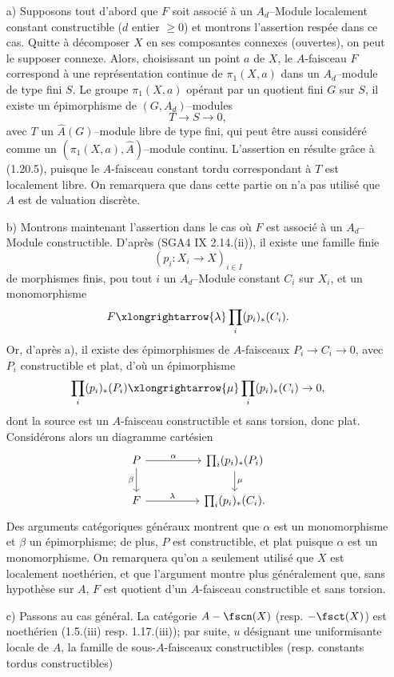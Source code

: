 \begin{itemize}
    \item[a)] Supposons tout d'abord que $F$ soit associé à un $A_d$--Module localement constant constructible ($d$ entier $\geq 0$) et montrons l'assertion respée dans ce cas. Quitte à décomposer $X$ en ses composantes connexes (ouvertes), on peut le supposer connexe. Alors, choisissant un point $a$ de $X$, le $A$-faisceau $F$ correspond à une représentation continue  de $\pi_1(X, a)$ dans un $A_d$--module de type fini $S$. Le groupe $\pi_1(X, a)$ opérant par un quotient fini $G$ sur $S$, il existe un épimorphisme de $(G, A_d)$--modules
    $$
    T \to S \to 0,
    $$
    avec $T$ un $\hat{A}(G)$--module libre de type fini, qui peut être aussi considéré comme un $(\pi_1(X, a), \hat{A})$--module continu. L'assertion en résulte grâce à (1.20.5), puisque le $A$-faisceau constant tordu correspondant à $T$ est localement libre. On remarquera que dans cette partie on n'a pas utilisé que $A$ est de valuation discrète. 
    \item[b)] Montrons maintenant l'assertion dans le cas où $F$ est associé à un $A_d$--Module constructible. D'après (SGA4 IX 2.14.(ii)), il existe une famille finie
    $$
    (p_i: X_i \to X)_{i \in I}
    $$
    de morphismes finis, pou tout $i$ un $A_d$--Module constant $C_i$ sur $X_i$, et un monomorphisme 
    $$
    F \xlongrightarrow{\lambda} \prod_i (p_i)_*(C_i).
    $$
    Or, d'après a), il existe des épimorphismes de $A$-faisceaux $P_i \to C_i \to 0$, avec $P_i$ constructible et plat, d'où un épimorphisme
    $$
    \prod_i(p_i)_*(P_i) \xlongrightarrow{\mu} \prod_i (p_i)_*(C_i) \to 0,
    $$dont la source est un $A$-faisceau constructible et sans torsion, donc plat. Considérons alors un diagramme cartésien
    \[\begin{tikzcd}
	P && {\prod_i(p_i)_*(P_i)} \\
	F && {\prod_i(p_i)_*(C_i).}
	\arrow["\beta"', from=1-1, to=2-1]
	\arrow["\lambda", from=2-1, to=2-3]
	\arrow["\alpha", from=1-1, to=1-3]
	\arrow["\mu", from=1-3, to=2-3]
    \end{tikzcd}\]
    Des arguments catégoriques généraux montrent que $\alpha$ est un monomorphisme et $\beta$ un épimorphisme; de plus, $P$ est constructible, et plat puisque $\alpha$ est un monomorphisme. On remarquera qu'on a seulement utilisé que $X$ est localement noethérien, et que l'argument montre plus généralement que, sans hypothèse sur $A$, $F$ est quotient d'un $A$-faisceau constructible et sans torsion.
    \item[c)] Passons au cas général. La catégorie $A-\fscn(X)$ (resp. $-\fsct(X)$) est noethérien (1.5.(iii) resp. 1.17.(iii)); par suite, $u$ désignant une uniformisante locale de $A$, la famille de sous-$A$-faisceaux constructibles (resp. constants tordus constructibles)

\end{itemize}
